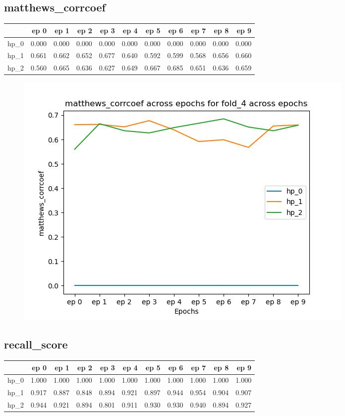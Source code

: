 \documentclass{article}
\begin{document}
\subsection{matthews\_corrcoef}
\begin{tabular}{lrrrrrrrrrr}
\toprule
{} &   ep 0 &   ep 1 &   ep 2 &   ep 3 &   ep 4 &   ep 5 &   ep 6 &   ep 7 &   ep 8 &   ep 9 \\
\midrule
hp\_0 &  0.000 &  0.000 &  0.000 &  0.000 &  0.000 &  0.000 &  0.000 &  0.000 &  0.000 &  0.000 \\
hp\_1 &  0.661 &  0.662 &  0.652 &  0.677 &  0.640 &  0.592 &  0.599 &  0.568 &  0.656 &  0.660 \\
hp\_2 &  0.560 &  0.665 &  0.636 &  0.627 &  0.649 &  0.667 &  0.685 &  0.651 &  0.636 &  0.659 \\
\bottomrule
\end{tabular}

\begin{figure}[H]
\includegraphics[scale = 0.75]{fold_4/matthews_corrcoef}
\end{figure}
\subsection{recall\_score}
\begin{tabular}{lrrrrrrrrrr}
\toprule
{} &   ep 0 &   ep 1 &   ep 2 &   ep 3 &   ep 4 &   ep 5 &   ep 6 &   ep 7 &   ep 8 &   ep 9 \\
\midrule
hp\_0 &  1.000 &  1.000 &  1.000 &  1.000 &  1.000 &  1.000 &  1.000 &  1.000 &  1.000 &  1.000 \\
hp\_1 &  0.917 &  0.887 &  0.848 &  0.894 &  0.921 &  0.897 &  0.944 &  0.954 &  0.904 &  0.907 \\
hp\_2 &  0.944 &  0.921 &  0.894 &  0.801 &  0.911 &  0.930 &  0.930 &  0.940 &  0.894 &  0.927 \\
\bottomrule
\end{tabular}
\end{document}
